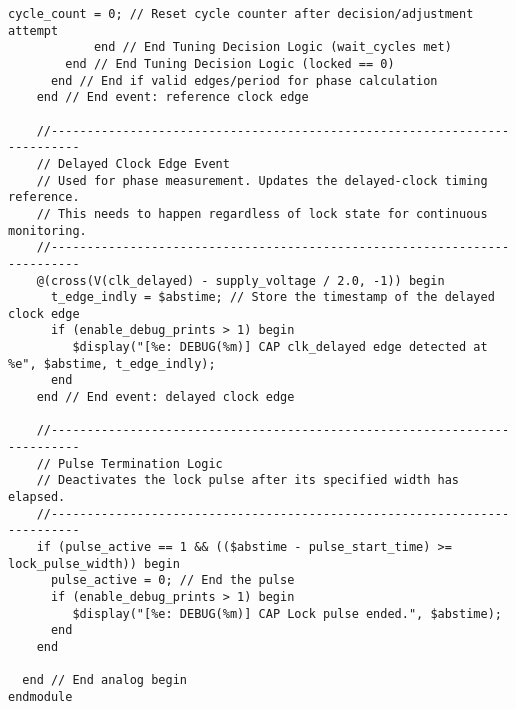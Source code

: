 \begin{lstlisting}[caption={Verilog-A Generic Capacitor Tuner Implementation}]
              cycle_count = 0; // Reset cycle counter after decision/adjustment attempt
            end // End Tuning Decision Logic (wait_cycles met)
        end // End Tuning Decision Logic (locked == 0)
      end // End if valid edges/period for phase calculation
    end // End event: reference clock edge

    //--------------------------------------------------------------------------
    // Delayed Clock Edge Event
    // Used for phase measurement. Updates the delayed-clock timing reference.
    // This needs to happen regardless of lock state for continuous monitoring.
    //--------------------------------------------------------------------------
    @(cross(V(clk_delayed) - supply_voltage / 2.0, -1)) begin
      t_edge_indly = $abstime; // Store the timestamp of the delayed clock edge
      if (enable_debug_prints > 1) begin
         $display("[%e: DEBUG(%m)] CAP clk_delayed edge detected at %e", $abstime, t_edge_indly);
      end
    end // End event: delayed clock edge

    //--------------------------------------------------------------------------
    // Pulse Termination Logic
    // Deactivates the lock pulse after its specified width has elapsed.
    //--------------------------------------------------------------------------
    if (pulse_active == 1 && (($abstime - pulse_start_time) >= lock_pulse_width)) begin
      pulse_active = 0; // End the pulse
      if (enable_debug_prints > 1) begin
         $display("[%e: DEBUG(%m)] CAP Lock pulse ended.", $abstime);
      end
    end

  end // End analog begin
endmodule

\end{lstlisting}